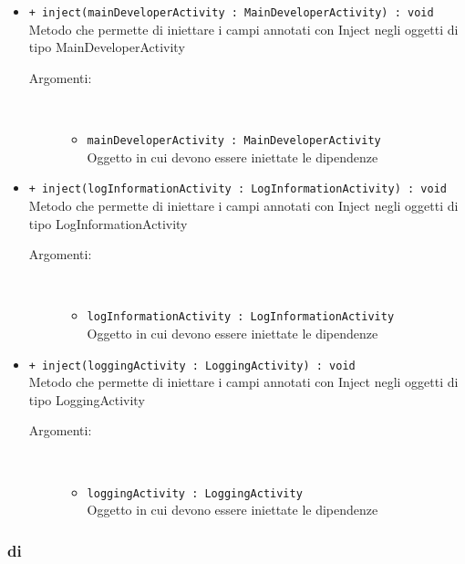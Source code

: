\documentclass[../DefinizioneDiProdotto.tex]{subfiles}
\begin{document}
\begin{description}
\begin{itemize}
\begin{description}
		\end{description}
		\item \texttt{+ inject(mainDeveloperActivity : MainDeveloperActivity) : void}\\
		Metodo che permette di iniettare i campi annotati con Inject negli oggetti di tipo MainDeveloperActivity
		\begin{description}
			\item[Argomenti:] \
			\begin{itemize}
				\item \texttt{mainDeveloperActivity : MainDeveloperActivity}\\
				Oggetto in cui devono essere iniettate le dipendenze\end{itemize}
		\end{description}
		\item \texttt{+ inject(logInformationActivity : LogInformationActivity) : void}\\
		Metodo che permette di iniettare i campi annotati con Inject negli oggetti di tipo LogInformationActivity
		\begin{description}
			\item[Argomenti:] \
			\begin{itemize}
				\item \texttt{logInformationActivity : LogInformationActivity}\\
				Oggetto in cui devono essere iniettate le dipendenze\end{itemize}
		\end{description}
		\item \texttt{+ inject(loggingActivity : LoggingActivity) : void}\\
		Metodo che permette di iniettare i campi annotati con Inject negli oggetti di tipo LoggingActivity
		\begin{description}
			\item[Argomenti:] \
			\begin{itemize}
				\item \texttt{loggingActivity : LoggingActivity}\\
				Oggetto in cui devono essere iniettate le dipendenze\end{itemize}
		\end{description}
	\end{itemize}
\end{description}
\subsubsection{di}
\end{document}
